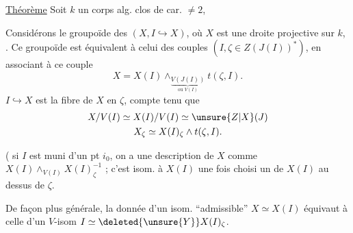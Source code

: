 \uline{Théorème} Soit $k$ un corps alg. clos de car. $\ne2$,

Considérons le groupoïde des $(X,I\hookrightarrow X)$, où $X$ est
une droite projective sur $k$, .
Ce groupoïde est équivalent à celui des couples $(I,\zeta\in Z(J(I))^*)$,
en associant à ce couple
\[
X=X(I)\wedge_{\underbrace{V(J(I))}_{\text{ou }V(I)}}t(\zeta,I).
\]
$I\hookrightarrow X$ est la fibre  de $X$ en $\zeta$, compte tenu que
\[
\begin{gathered}
X/V(I)\simeq X(I)/V(I)\simeq\unsure{Z|X}(J)\\
X_\zeta\simeq X(I)_\zeta\wedge t(\zeta,I).
\end{gathered}
\]

( si $I$ est muni d'un pt $i_0$, on a une description
de $X$ comme $X(I)\wedge_{V(I)}X(I)_\zeta^{-1}$ ; c'est isom. à $X(I)$ une
fois choisi un  de $X(I)$ au dessus de $\zeta$.

De façon plus générale,  la donnée d'un
isom. ``admissible'' $X\simeq X(I)$ équivaut à celle d'un
$V$-isom $I\simeq\deleted{\unsure{Y}}X(I)_\zeta$.
